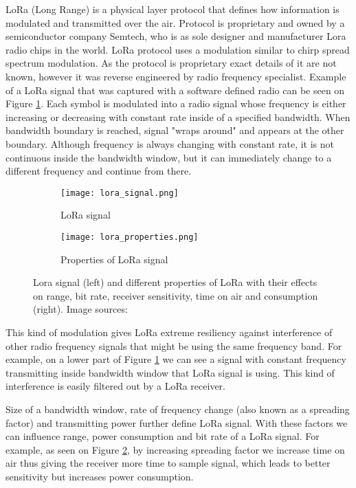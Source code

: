 LoRa (Long Range) is a physical layer protocol that defines how information is modulated and transmitted over the air\cite{lora_article}\cite{lora_nbiot}.
Protocol is proprietary and owned by a semiconductor company Semtech, who is as sole designer and manufacturer Lora radio chips in the world.
LoRa protocol uses a modulation similar to chirp spread spectrum modulation\cite{lora_article}.
As the protocol is proprietary exact details of it are not known, however it was reverse engineered by radio frequency specialist\cite{lora_github}.
Example of a LoRa signal that was captured with a software defined radio can be seen on Figure \ref{lora1}.
Each symbol is modulated into a radio signal whose frequency is either increasing or decreasing with constant rate inside of a specified bandwidth.
When bandwidth boundary is reached, signal "wraps around" and appears at the other boundary.
Although frequency is always changing with constant rate, it is not continuous inside the bandwidth window, but it can immediately change to a different frequency and continue from there.

\begin{figure}[ht]
    \begin{subfigure}{0.3\textwidth}
        \centering
        \texttt{[image: lora\_signal.png]} 
        \caption{ LoRa signal}
        \label{lora1}
    \end{subfigure}
    \hspace{0.5cm}%
    \begin{subfigure}{0.7\textwidth}
        \texttt{[image: lora\_properties.png]}
        \caption{ Properties of LoRa signal}
        \label{lora2}
    \end{subfigure}
    \caption{Lora signal (left) and different properties of LoRa with their effects on range, bit rate, receiver sensitivity, time on air and consumption (right). Image sources:\cite{lora_github}\cite{lora_philly}}
    \label{lora}
\end{figure}

This kind of modulation gives LoRa extreme resiliency against interference of other radio frequency signals that might be using the same frequency band\cite{lora_article}\cite{lora_philly}.
For example, on a lower part of Figure \ref{lora1} we can see a signal with constant frequency transmitting inside bandwidth window that LoRa signal is using.
This kind of interference is easily filtered out by a LoRa receiver.

Size of a bandwidth window, rate of frequency change (also known as a spreading factor) and transmitting power further define LoRa signal.
With these factors we can influence range, power consumption and bit rate of a LoRa signal.
For example, as seen on Figure \ref{lora2}, by increasing spreading factor we increase time on air thus giving the receiver more time to sample signal, which leads to better sensitivity but increases power consumption.

